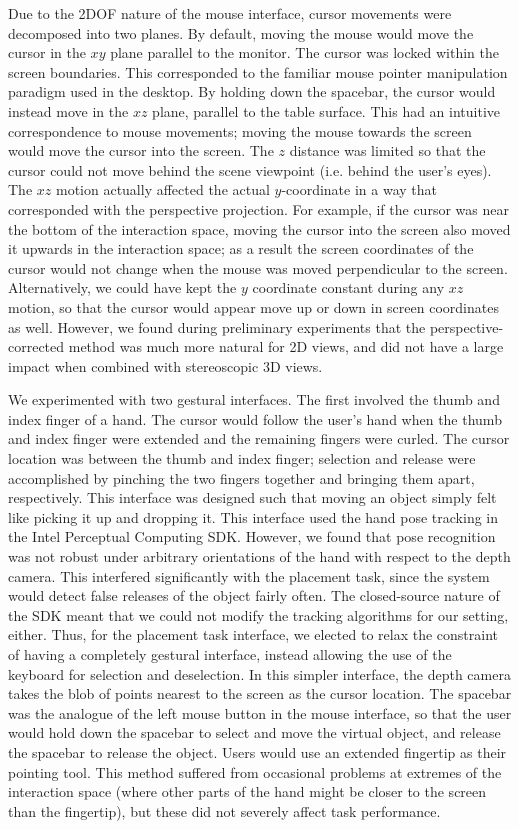 \documentclass[pageno]{jpaper}
\begin{document}
Due to the 2DOF nature of the mouse interface, cursor movements were decomposed into two planes.
By default, moving the mouse would move the cursor in the $xy$ plane parallel to the monitor.
The cursor was locked within the screen boundaries. This corresponded to the familiar mouse pointer
manipulation paradigm used in the desktop. By holding down the spacebar, the cursor would instead move in the
$xz$ plane, parallel to the table surface. This had an intuitive correspondence to mouse movements; moving
the mouse towards the screen would move the cursor into the screen. The $z$ distance was limited so that the
cursor could not move behind the scene viewpoint (i.e. behind the user's eyes). The $xz$ motion actually affected the actual $y$-coordinate
in a way that corresponded with the perspective projection. For example, if the cursor was near the bottom of the interaction
space, moving the cursor into the screen also moved it upwards in the interaction space; as a result the screen
coordinates of the cursor would not change when the mouse was moved perpendicular to the screen. Alternatively, we could have kept the $y$ coordinate
constant during any $xz$ motion, so that the cursor would appear move up or down in screen coordinates as well. However,
we found during preliminary experiments that the perspective-corrected method was much more natural for 2D views, and did
not have a large impact when combined with stereoscopic 3D views.

We experimented with two gestural interfaces. The first involved the thumb and index finger of a hand. The cursor would
follow the user's hand when the thumb and index finger were extended and the remaining fingers were curled. The cursor
location was between the thumb and index finger; selection and release were accomplished by pinching the two fingers
together and bringing them apart, respectively. This interface was designed such that moving an object simply felt like
picking it up and dropping it. This interface used the hand pose tracking in the Intel Perceptual Computing SDK.
However, we found that pose recognition
was not robust under arbitrary orientations of the hand with respect to the depth camera. This interfered significantly with
the placement task, since the system would detect false releases of the object fairly often. The closed-source nature of the SDK meant that
we could not modify the tracking algorithms for our setting, either. Thus, for the placement task interface, we elected to
relax the constraint of having a completely gestural interface, instead allowing the use of the keyboard for selection and
deselection. In this simpler interface, the depth camera takes the blob of points nearest to the screen as the cursor location.
The spacebar was the analogue of the left mouse button in the mouse interface, so that the user would hold down the spacebar
to select and move the virtual object, and release the spacebar to release the object. Users would use an extended fingertip as
their pointing tool. This method suffered from occasional problems at extremes of the interaction space (where other parts of the hand
might be closer to the screen than the fingertip), but these did not severely affect task performance.
\end{document}
